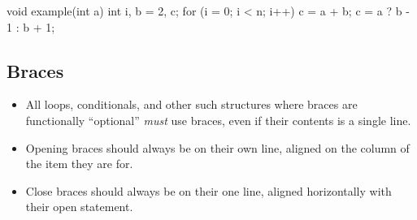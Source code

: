 \documentclass[StyleGuide.tex]{subfiles}
\begin{document}
\begin{code}[caption=Spacing example, label=lst:spacing-example]
void example(int a) {
	int i, b = 2, c;
	for (i = 0; i < n; i++) {
		c = a + b;
		c = a ? b - 1 : b + 1;
	}
}
\end{code}

\subsection{Braces}\label{braces}

\begin{itemize}
\item
  All loops, conditionals, and other such structures where braces are
  functionally ``optional'' \emph{must} use braces, even if their
  contents is a single line.
\item
  Opening braces should always be on their own line, aligned on the
  column of the item they are for.
\item
  Close braces should always be on their one line, aligned horizontally
  with their open statement.
\end{itemize}
\end{document}
